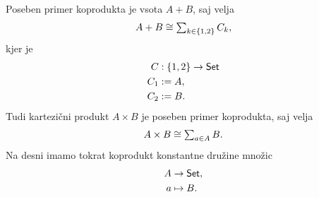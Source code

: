 Poseben primer koprodukta je vsota $A + B$, saj velja
%
\begin{equation*}
  A + B \cong \Sum{k \in \set{1, 2}} C_k,
\end{equation*}
%
kjer je
%
\begin{align*}
  C &: \left\{1, 2\right\} \to \mathsf{Set} \\
  C_1 &\mathrel{{:}{=}} A, \\
  C_2 &\mathrel{{:}{=}} B.
\end{align*}
%
Tudi kartezični produkt $A \times B$ je poseben primer koprodukta, saj velja
%
\begin{equation*}
    A \times B \cong \Sum{a \in A} B.
\end{equation*}
%
Na desni imamo tokrat koprodukt konstantne družine množic
%
\begin{align*}
  A &\to \mathsf{Set}, \\
  a &\mapsto B.
\end{align*}
